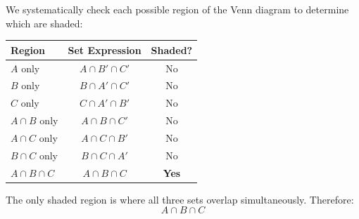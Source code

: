 \documentclass[12pt]{article}
\begin{document}
\begin{center}
\end{center}



\begin{stepbox}[Figure (i)]
We systematically check each possible region of the Venn diagram to determine which are shaded:

\begin{center}
\begin{tabular}{lcc}
\toprule
\textbf{Region} & \textbf{Set Expression} & \textbf{Shaded?} \\
\midrule
$A$ only & $A \cap B' \cap C'$ & No \\
$B$ only & $B \cap A' \cap C'$ & No \\
$C$ only & $C \cap A' \cap B'$ & No \\
\midrule
$A \cap B$ only & $A \cap B \cap C'$ & No \\
$A \cap C$ only & $A \cap C \cap B'$ & No \\
$B \cap C$ only & $B \cap C \cap A'$ & No \\
\midrule
$A \cap B \cap C$ & $A \cap B \cap C$ & \textbf{Yes} \\
\bottomrule
\end{tabular}
\end{center}

The only shaded region is where all three sets overlap simultaneously. Therefore:
\[
\boxed{A \cap B \cap C}
\]
\end{stepbox}
\end{document}
